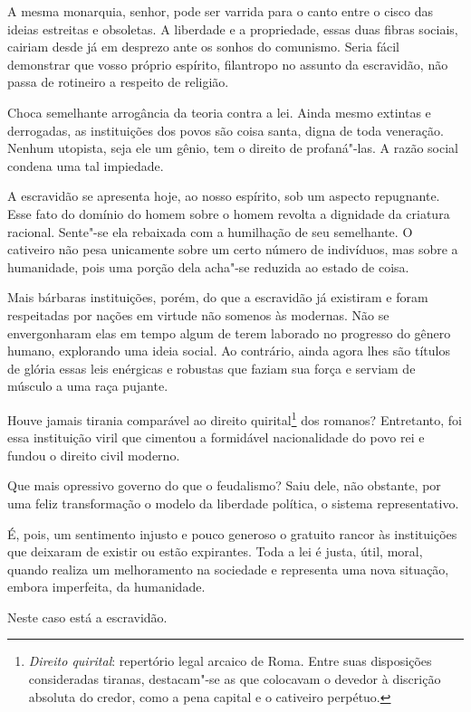 A mesma monarquia, senhor, pode ser varrida para o canto entre o cisco
das ideias estreitas e obsoletas. A liberdade e a propriedade, essas
duas fibras sociais, cairiam desde já em desprezo ante os sonhos do
comunismo. Seria fácil demonstrar que vosso próprio espírito,
filantropo no assunto da escravidão, não passa de rotineiro a respeito de religião.

Choca semelhante arrogância da teoria contra a lei. Ainda mesmo extintas
e derrogadas, as instituições dos povos são coisa santa, digna de toda
veneração. Nenhum utopista, seja ele um gênio, tem o direito de
profaná"-las. A razão social condena uma tal impiedade. 

A escravidão se apresenta hoje, ao nosso espírito, sob um aspecto
repugnante. Esse fato do domínio do homem sobre o homem revolta a
dignidade da criatura racional. Sente"-se ela rebaixada com a
humilhação de seu semelhante. O cativeiro não pesa unicamente sobre um
certo número de indivíduos, mas sobre a humanidade, pois uma porção
dela acha"-se reduzida ao estado de coisa.

Mais bárbaras instituições, porém, do que a escravidão já existiram e
foram respeitadas por nações em virtude não somenos às modernas. Não se
envergonharam elas em tempo algum de terem laborado no progresso do
gênero humano, explorando uma ideia social. Ao contrário, ainda agora
lhes são títulos de glória essas leis enérgicas e robustas que faziam
sua força e serviam de músculo a uma raça pujante. 

Houve jamais tirania comparável ao direito
quirital\footnote{ \textit{Direito quirital}: repertório legal arcaico de Roma. 
Entre suas disposições consideradas tiranas, destacam"-se as que colocavam 
o devedor à discrição absoluta do credor, como a pena capital e o cativeiro perpétuo.} 
dos romanos? Entretanto, foi essa instituição viril que cimentou a
formidável nacionalidade do povo rei e fundou o direito civil moderno. 

Que mais opressivo governo do que o feudalismo? Saiu dele, não obstante,
por uma feliz transformação o modelo da liberdade política, o sistema
representativo. 

É, pois, um sentimento injusto e pouco generoso o gratuito rancor às
instituições que deixaram de existir ou estão expirantes. Toda a lei é
justa, útil, moral, quando realiza um melhoramento na sociedade e
representa uma nova situação, embora imperfeita, da humanidade. 

Neste caso está a escravidão.

